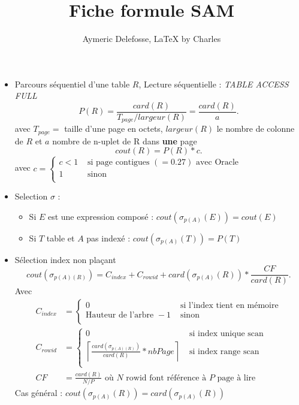 \documentclass{article}
\title{Fiche formule SAM}
\author{Aymeric Delefosse, LaTeX by Charles}
\theoremstyle{plain}%
\theoremstyle{definition}
\theoremstyle{remark}
\begin{document}
\maketitle
\begin{itemize}
    \item Parcours séquentiel d'une table $ R $, Lecture séquentielle : \textit{TABLE ACCESS FULL} 
    \[
        P(R) = \frac{card(R)}{T_{page} / largeur(R)} = \frac{card(R)}{a}
    .\]
    avec $ T_{page} = $ taille d'une page en octets, $largeur(R)$ le nombre de colonne de $R$ et $ a $ nombre de n-uplet de R dans \textbf{une} page
    \[
        cout(R) = P(R) * c
    .\]
    avec $ c = \begin{cases}
    c < 1  &\text{ si page contigues } (= 0.27) \text{ avec Oracle}\\
    1 &\text{ sinon }\\
    \end{cases}  $ 
    \item Selection $ \sigma  $ : \begin{itemize}
        \item Si $ E $ est une expression composé : $ cout(\sigma _{p(A)}(E)) = cout(E) $
        \item Si $ T $ table et $ A $ pas indexé : $ cout(\sigma _{p(A)}(T)) = P(T) $ 
    \end{itemize}
    \item Sélection index non plaçant 
    \[
        cout(\sigma _{p(A)(R)}) = C_{index} + C_{rowid} + card(\sigma _{p(A)}(R)) * \frac{CF}{card(R)}
    .\]
    Avec \begin{align*}
        C_{index} &= \begin{cases}
        0 &\text{ si l'index tient en mémoire}\\
        \text{Hauteur de l'arbre } - 1 &\text{ sinon}\\
        \end{cases} \\
        C_{rowid} &= \begin{cases}
        0 &\text{ si index unique scan} \\
        \left\lceil \frac{card(\sigma _{p(A)(R)})}{card(R)} * nbPage \right\rceil &\text{ si index range scan}\\
        \end{cases} \\
        CF &= \frac{card(R)}{N/P} \text{ où } N \text{ rowid font référence à } P \text{ page à lire}
    \end{align*}
    Cas général : $ cout(\sigma _{p(A)}(R)) = card(\sigma _{p(A)}(R)) $ 

\end{itemize}
\end{document}

